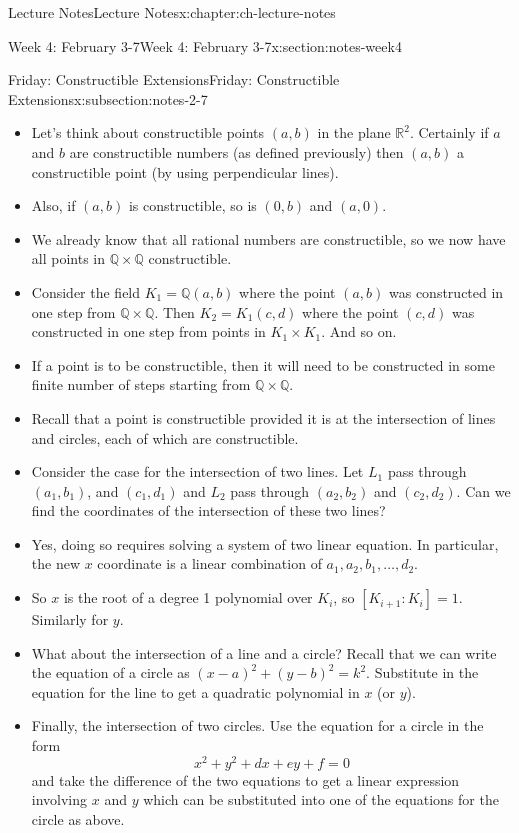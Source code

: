 \documentclass[oneside,11pt,]{book}
\newcommand{\R}{\mathbb{R}}
\begin{document}
\begin{chapterptx}{Lecture Notes}{}{Lecture Notes}{}{}{x:chapter:ch-lecture-notes}
\begin{sectionptx}{Week 4: February 3-7}{}{Week 4: February 3-7}{}{}{x:section:notes-week4}
\begin{subsectionptx}{Friday: Constructible Extensions}{}{Friday: Constructible Extensions}{}{}{x:subsection:notes-2-7}
\par
%
\begin{itemize}[label=\textbullet]
\item{}Let’s think about constructible points \((a,b)\) in the plane \(\R^2\). Certainly if \(a\) and \(b\) are constructible numbers (as defined previously) then \((a,b)\) a constructible point (by using perpendicular lines).%
\item{}Also, if \((a,b)\) is constructible, so is \((0,b)\) and \((a,0)\).%
\item{}We already know that all rational numbers are constructible, so we now have all points in \(\mathbb Q\times\mathbb Q\) constructible.%
\item{}Consider the field \(K_1 = \mathbb Q(a,b)\) where the point \((a,b)\) was constructed in one step from \(\mathbb Q\times \mathbb Q\). Then \(K_2 = K_1(c,d)\) where the point \((c,d)\) was constructed in one step from points in \(K_1\times K_1\). And so on.%
\item{}If a point is to be constructible, then it will need to be constructed in some finite number of steps starting from \(\mathbb Q\times\mathbb Q\).%
\item{}Recall that a point is constructible provided it is at the intersection of lines and circles, each of which are constructible.%
\item{}Consider the case for the intersection of two lines. Let \(L_1\) pass through \((a_1,b_1)\), and \((c_1, d_1)\) and \(L_2\) pass through \((a_2, b_2)\) and \((c_2, d_2)\). Can we find the coordinates of the intersection of these two lines?%
\item{}Yes, doing so requires solving a system of two linear equation. In particular, the new \(x\) coordinate is a linear combination of \(a_1, a_2, b_1, \ldots, d_2\).%
\item{}So \(x\) is the root of a degree 1 polynomial over \(K_i\), so \([K_{i+1}:K_i] = 1\). Similarly for \(y\).%
\item{}What about the intersection of a line and a circle? Recall that we can write the equation of a circle as \((x-a)^2 + (y- b)^2 = k^2\). Substitute in the equation for the line to get a quadratic polynomial in \(x\) (or \(y\)).%
\item{}Finally, the intersection of two circles. Use the equation for a circle in the form%
\begin{equation*}
x^2 + y^2 +dx + ey + f = 0
\end{equation*}
and take the difference of the two equations to get a linear expression involving \(x\) and \(y\) which can be substituted into one of the equations for the circle as above.%

\end{itemize}
\end{subsectionptx}
\end{sectionptx}
\end{chapterptx}
\end{document}
